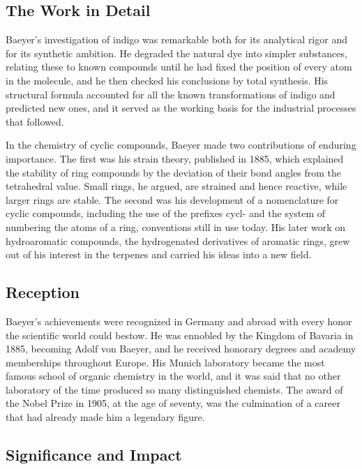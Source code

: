 \subsection*{The Work in Detail}

Baeyer's investigation of indigo was remarkable both for its analytical rigor and for its synthetic ambition. He degraded the natural dye into simpler substances, relating these to known compounds until he had fixed the position of every atom in the molecule, and he then checked his conclusions by total synthesis. His structural formula accounted for all the known transformations of indigo and predicted new ones, and it served as the working basis for the industrial processes that followed.

In the chemistry of cyclic compounds, Baeyer made two contributions of enduring importance. The first was his strain theory, published in 1885, which explained the stability of ring compounds by the deviation of their bond angles from the tetrahedral value. Small rings, he argued, are strained and hence reactive, while larger rings are stable. The second was his development of a nomenclature for cyclic compounds, including the use of the prefixes cycl- and the system of numbering the atoms of a ring, conventions still in use today. His later work on hydroaromatic compounds, the hydrogenated derivatives of aromatic rings, grew out of his interest in the terpenes and carried his ideas into a new field.

\subsection*{Reception}

Baeyer's achievements were recognized in Germany and abroad with every honor the scientific world could bestow. He was ennobled by the Kingdom of Bavaria in 1885, becoming Adolf von Baeyer, and he received honorary degrees and academy memberships throughout Europe. His Munich laboratory became the most famous school of organic chemistry in the world, and it was said that no other laboratory of the time produced so many distinguished chemists. The award of the Nobel Prize in 1905, at the age of seventy, was the culmination of a career that had already made him a legendary figure.

\subsection*{Significance and Impact}

